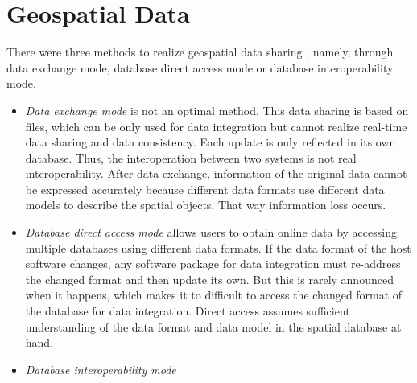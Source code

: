 \documentclass[12pt,a4paper]{report}
\newcommand{\term}{\textit}
\begin{document}
	\section{Geospatial Data}
	\label{sec:fed_geodata:geodata}

	There were three methods to realize geospatial data sharing \citep{Shi}, namely, through data exchange mode, database direct access mode or database interoperability mode. 
	\begin{itemize} 
		\item \term{Data exchange mode} is not an optimal method. This data sharing is based on files, which can be only used for data integration but cannot realize real-time data sharing and data consistency. Each update is only reflected in its own database. Thus, the interoperation between two systems is not real interoperability. After data exchange, information of the original data cannot be expressed accurately because different data formats use different data models to describe the spatial objects. That way information loss occurs.
		\item \term{Database direct access mode} allows users to obtain online data by accessing multiple databases using different data formats. If the data format of the host software changes, any software package for data integration must re-address the changed format and then update its own. But this is rarely announced when it happens, which makes it to difficult to access the changed format of the database for data integration. Direct access assumes sufficient understanding of the data format and data model in the spatial database at hand.
		\item \term{Database interoperability mode}
	\end{itemize} 

	\renewcommand{\bibname}{References}
	
	
\end{document}
